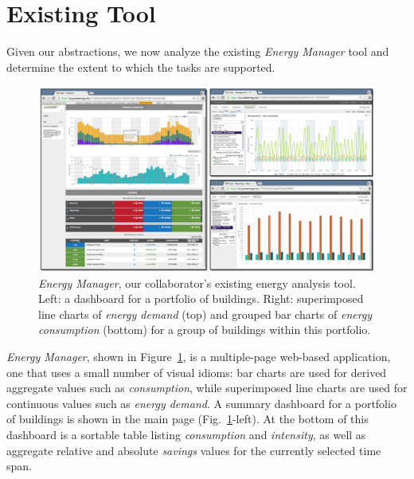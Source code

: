 \documentclass[journal]{vgtc}                %
\begin{document}

\section{Existing Tool}
\label{existing-tool}


Given our abstractions, we now analyze the existing {\it Energy Manager} tool and determine the extent to which the tasks are supported.

\begin{figure}[bp!]
    \vspace{-0.6cm}
	\centering
	\includegraphics[width=\textwidth]{figures/em.pdf}
	\vspace{-0.6cm}
	\caption{\textsl{Energy Manager}, our collaborator's existing energy analysis tool. Left: a dashboard for a portfolio of buildings. Right: superimposed line charts of \textsl{energy demand} (top) and grouped bar charts of \textsl{energy consumption} (bottom) for a group of buildings within this portfolio.}
	\label{fig:energy-manager}
\end{figure} 


{\it Energy Manager}, shown in Figure~\ref{fig:energy-manager}, is a multiple-page web-based application, one that uses a small number of visual idioms: bar charts are used for derived aggregate values such as {\it consumption}, while superimposed line charts are used for continuous values such as {\it energy demand}.
A summary dashboard for a portfolio of buildings is shown in the main page (Fig.~\ref{fig:energy-manager}-left). 
At the bottom of this dashboard is a sortable table listing {\it consumption} and {\it intensity}, as well as aggregate relative and absolute {\it savings} values for the currently selected time span. 
\end{document}
